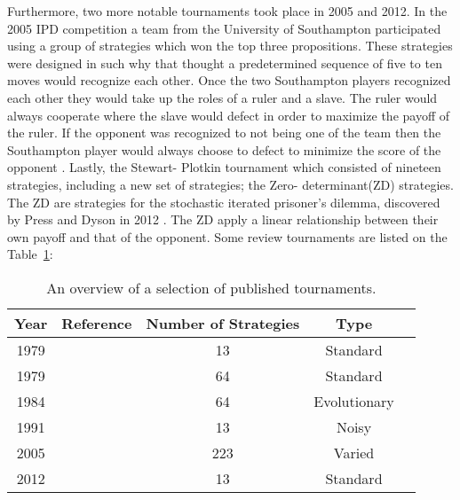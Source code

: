 Furthermore, two more notable tournaments took place in 2005 and 2012.
In the 2005 IPD competition a team from the University of Southampton participated
using a group of strategies which won the top three propositions. These strategies
were designed in such why that thought a predetermined sequence of five to ten
moves would recognize each other. Once the two Southampton players recognized
each other they would take up the roles of a ruler and a slave. The ruler
would always cooperate where the slave would defect in order to maximize the
payoff of the ruler. If the opponent was recognized to not being one of the team
then the Southampton player would always choose to defect to minimize the score
of the opponent \cite{Li2011}. Lastly, the Stewart- Plotkin \cite{Stewart2012}
tournament which
consisted of nineteen strategies, including a new set of strategies; the Zero-
determinant(ZD) strategies. The ZD are strategies for the stochastic iterated
prisoner's dilemma, discovered by Press and Dyson in 2012 \cite{Press2012a}.
The ZD apply a linear relationship between their own payoff and that of the opponent.
Some review tournaments are listed on the Table~\ref{tab:tournaments}:

\begin{table}[!hbtp]
    \begin{center}
        \begin{tabular}{ccccc}
            \toprule
            Year     & Reference                  & Number of Strategies & Type     \\
            \midrule
            1979     & \cite{Axelrod1980a}        & 13                   & Standard  \\
            1979     & \cite{Axelrod1980b}        & 64                   & Standard  \\
            1984     & \cite{Axelrod1981}         & 64                   & Evolutionary\\
            1991     & \cite{The2016}          & 13                   & Noisy     \\
            2005     & \cite{Chong2004} & 223                  & Varied    \\
            2012     & \cite{Stewart2012}         & 13                   & Standard   \\
            \bottomrule
        \end{tabular}
    \end{center}
    \caption{An overview of a selection of published tournaments.}\label{tab:tournaments}
\end{table}

